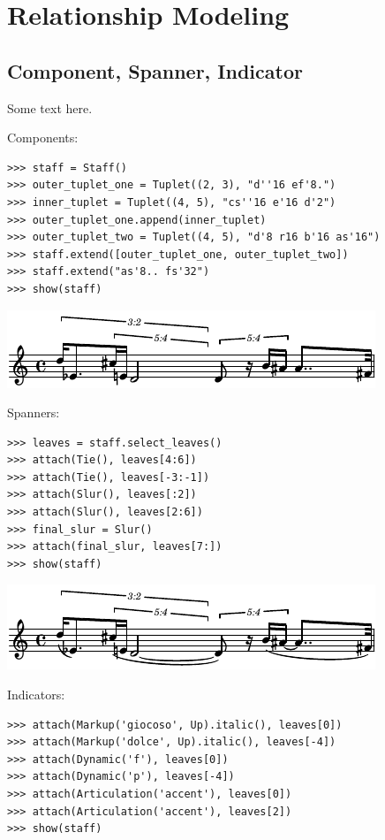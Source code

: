 \section{Relationship Modeling}\label{sec:relationship_modeling}

\subsection{Component, Spanner, Indicator}

Some text here.

Components:

\begin{lstlisting}
>>> staff = Staff()
>>> outer_tuplet_one = Tuplet((2, 3), "d''16 ef'8.")
>>> inner_tuplet = Tuplet((4, 5), "cs''16 e'16 d'2")
>>> outer_tuplet_one.append(inner_tuplet)
>>> outer_tuplet_two = Tuplet((4, 5), "d'8 r16 b'16 as'16")
>>> staff.extend([outer_tuplet_one, outer_tuplet_two])
>>> staff.extend("as'8.. fs'32")
>>> show(staff)
\end{lstlisting}

\includegraphics[scale=1.0]{images/section_4_relationship_modeling-1.pdf}


Spanners:

\begin{lstlisting}
>>> leaves = staff.select_leaves()
>>> attach(Tie(), leaves[4:6])
>>> attach(Tie(), leaves[-3:-1])
>>> attach(Slur(), leaves[:2])
>>> attach(Slur(), leaves[2:6])
>>> final_slur = Slur()
>>> attach(final_slur, leaves[7:])
>>> show(staff)
\end{lstlisting}

\includegraphics[scale=1.0]{images/section_4_relationship_modeling-2.pdf}


Indicators:

\begin{lstlisting}
>>> attach(Markup('giocoso', Up).italic(), leaves[0])
>>> attach(Markup('dolce', Up).italic(), leaves[-4])
>>> attach(Dynamic('f'), leaves[0])
>>> attach(Dynamic('p'), leaves[-4])
>>> attach(Articulation('accent'), leaves[0])
>>> attach(Articulation('accent'), leaves[2])
>>> show(staff)
\end{lstlisting}


